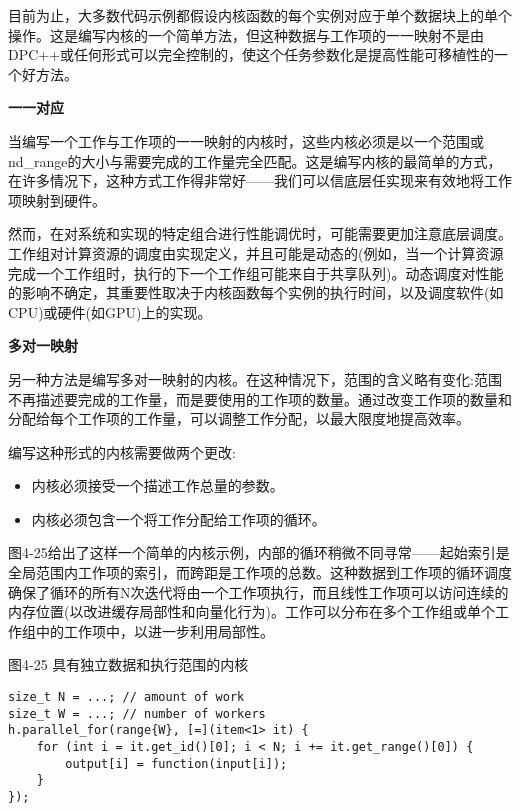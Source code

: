 目前为止，大多数代码示例都假设内核函数的每个实例对应于单个数据块上的单个操作。这是编写内核的一个简单方法，但这种数据与工作项的一一映射不是由DPC++或任何形式可以完全控制的，使这个任务参数化是提高性能可移植性的一个好方法。\par

\hspace*{\fill} \par %
\textbf{一一对应}

当编写一个工作与工作项的一一映射的内核时，这些内核必须是以一个范围或nd\_range的大小与需要完成的工作量完全匹配。这是编写内核的最简单的方式，在许多情况下，这种方式工作得非常好——我们可以信底层任实现来有效地将工作项映射到硬件。\par

然而，在对系统和实现的特定组合进行性能调优时，可能需要更加注意底层调度。工作组对计算资源的调度由实现定义，并且可能是动态的(例如，当一个计算资源完成一个工作组时，执行的下一个工作组可能来自于共享队列)。动态调度对性能的影响不确定，其重要性取决于内核函数每个实例的执行时间，以及调度软件(如CPU)或硬件(如GPU)上的实现。\par

\hspace*{\fill} \par %
\textbf{多对一映射}

另一种方法是编写多对一映射的内核。在这种情况下，范围的含义略有变化:范围不再描述要完成的工作量，而是要使用的工作项的数量。通过改变工作项的数量和分配给每个工作项的工作量，可以调整工作分配，以最大限度地提高效率。\par

编写这种形式的内核需要做两个更改:\par

\begin{itemize}
	\item 内核必须接受一个描述工作总量的参数。
	\item 内核必须包含一个将工作分配给工作项的循环。
\end{itemize}

图4-25给出了这样一个简单的内核示例，内部的循环稍微不同寻常——起始索引是全局范围内工作项的索引，而跨距是工作项的总数。这种数据到工作项的循环调度确保了循环的所有N次迭代将由一个工作项执行，而且线性工作项可以访问连续的内存位置(以改进缓存局部性和向量化行为)。工作可以分布在多个工作组或单个工作组中的工作项中，以进一步利用局部性。\par

\hspace*{\fill} \par %
图4-25 具有独立数据和执行范围的内核
\begin{lstlisting}[caption={}]
size_t N = ...; // amount of work
size_t W = ...; // number of workers
h.parallel_for(range{W}, [=](item<1> it) {
	for (int i = it.get_id()[0]; i < N; i += it.get_range()[0]) {
		output[i] = function(input[i]);
	}
});
\end{lstlisting}

